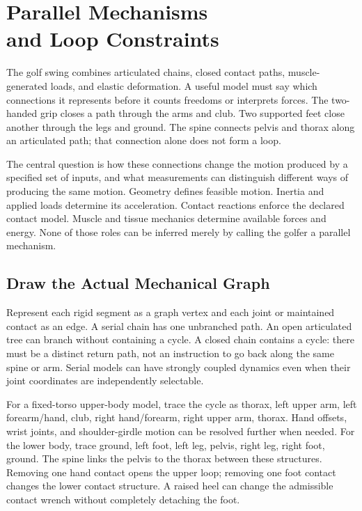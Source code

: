 \chapter[Parallel Mechanisms and Loop Constraints]{Parallel Mechanisms\\and Loop Constraints}
\label{ch:parallel_mechanisms}

The golf swing combines articulated chains, closed contact paths, muscle-generated
loads, and elastic deformation. A useful model must say which connections it
represents before it counts freedoms or interprets forces. The two-handed grip
closes a path through the arms and club. Two supported feet close another through
the legs and ground. The spine connects pelvis and thorax along an articulated
path; that connection alone does not form a loop.

The central question is how these connections change the motion produced by a
specified set of inputs, and what measurements can distinguish different ways
of producing the same motion. Geometry defines feasible motion. Inertia and
applied loads determine its acceleration. Contact reactions enforce the declared
contact model. Muscle and tissue mechanics determine available forces and energy.
None of those roles can be inferred merely by calling the golfer a parallel
mechanism.

\section{Draw the Actual Mechanical Graph}
\label{sec:serial_vs_parallel}

Represent each rigid segment as a graph vertex and each joint or maintained
contact as an edge. A serial chain has one unbranched path. An open articulated
tree can branch without containing a cycle. A closed chain contains a cycle:
there must be a distinct return path, not an instruction to go back along the
same spine or arm. Serial models can have strongly coupled dynamics even when
their joint coordinates are independently selectable.

For a fixed-torso upper-body model, trace the cycle as thorax, left upper arm,
left forearm/hand, club, right hand/forearm, right upper arm, thorax. Hand offsets,
wrist joints, and shoulder-girdle motion can be resolved further when needed.
For the lower body, trace ground, left foot, left leg, pelvis, right leg, right
foot, ground. The spine links the pelvis to the thorax between these structures.
Removing one hand contact opens the upper loop; removing one foot contact changes
the lower contact structure. A raised heel can change the admissible contact
wrench without completely detaching the foot.

